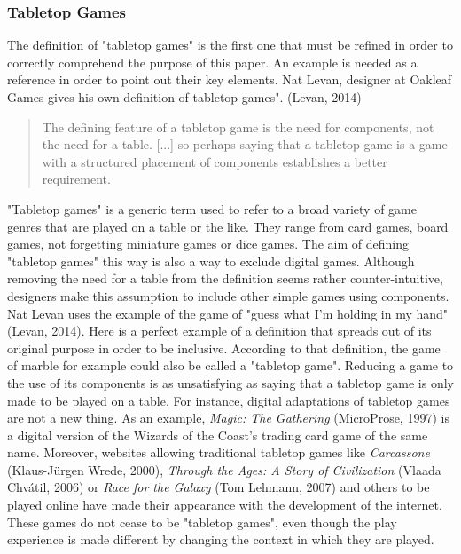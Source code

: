 \subsubsection{Tabletop Games}
The definition of "tabletop games" is the first one that must be refined in order to correctly comprehend the purpose of this paper. An example is needed as a reference in order to point out their key elements. Nat Levan, designer at Oakleaf Games gives his own definition of tabletop games". (Levan, 2014)
\begin{quotation}
The defining feature of a tabletop game is the need for components, not the need for a table. [...] so perhaps saying that a tabletop game is a game with a structured placement of components establishes a better requirement.
\end{quotation} 
"Tabletop games" is a generic term used to refer to a broad variety of game genres that are played on a table or the like. They range from card games, board games, not forgetting miniature games or dice games. The aim of defining "tabletop games" this way is also a way to exclude digital games. Although removing the need for a table from the definition seems rather counter-intuitive, designers make this assumption to include other simple games using components. Nat Levan uses the example of the game of "guess what I’m holding in my hand"(Levan, 2014). Here is a perfect example of a definition that spreads out of its original purpose in order to be inclusive. According to that definition, the game of marble for example could also be called a "tabletop game". Reducing a game to the use of its components is as unsatisfying as saying that a tabletop game is only made to be played on a table. For instance, digital adaptations of tabletop games are not a new thing. As an example, \textit{Magic: The Gathering} (MicroProse, 1997) is a digital version of the Wizards of the Coast’s trading card game of the same name. Moreover, websites allowing traditional tabletop games like \textit{Carcassone} (Klaus-Jürgen Wrede, 2000), \textit{Through the Ages: A Story of Civilization} (Vlaada Chvátil, 2006) or \textit{Race for the Galaxy} (Tom Lehmann, 2007) and others to be played online have made their appearance with the development of the internet. These games do not cease to be "tabletop games", even though the play experience is made different by changing the context in which they are played.



